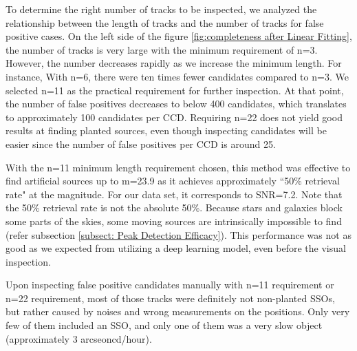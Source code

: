 \documentclass{aastex631}
\begin{document}
To determine the right number of tracks to be inspected, we analyzed the relationship between the length of tracks and the number of tracks for false positive cases.
On the left side of the figure \ref{fig:completeness after Linear Fitting}, the number of tracks is very large with the minimum requirement of n=3.
However, the number decreases rapidly as we increase the minimum length.
For instance, With n=6, there were ten times fewer candidates compared to n=3.
We selected n=11 as the practical requirement for further inspection.
At that point, the number of false positives decreases to below 400 candidates, which translates to approximately 100 candidates per CCD.
Requiring n=22 does not yield good results at finding planted sources, even though inspecting candidates will be easier since the number of false positives per CCD is around 25.


With the n=11 minimum length requirement chosen, this method was effective to find artificial sources up to m=23.9 as it achieves approximately ``50\% retrieval rate" at the magnitude.
For our data set, it corresponds to SNR=7.2.
Note that the 50\% retrieval rate is not the absolute 50\%.
Because stars and galaxies block some parts of the skies, some moving sources are intrinsically impossible to find (refer subsection \ref{subsect: Peak Detection Efficacy}).
This performance was not as good as we expected from utilizing a deep learning model, even before the visual inspection.

Upon inspecting false positive candidates manually with n=11 requirement or n=22 requirement, most of those tracks were definitely not non-planted SSOs, but rather caused by noises and wrong measurements on the positions.
Only very few of them included an SSO, and only one of them was a very slow object (approximately 3 arcseoncd/hour).
\end{document}
